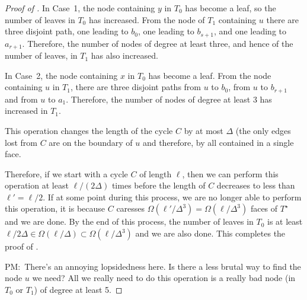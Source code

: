 \documentclass{patmorin}
\newcommand{\dual}[1]{{#1}^\star}
\newcommand{\note}[2]{{\color{red}#1:~#2}}
\begin{document}
\begin{proof}[Proof of ]
In Case~1, the node containing $y$ in $T_0$ has become a leaf, so
the number of leaves in $T_0$ has increased.  From the node of $T_1$
containing $u$ there are three disjoint path, one leading to $b_0$,
one leading to $b_{s+1}$, and one leading to $a_{r+1}$.  Therefore,
the number of nodes of degree at least three, and hence of the number
of leaves, in $T_1$ has also increased.

In Case~2, the node containing $x$ in $T_0$ has become a leaf.  From the
node containing $u$ in $T_1$, there are three disjoint paths from $u$
to $b_0$, from $u$ to $b_{r+1}$ and from $u$ to $a_1$.  Therefore,
the number of nodes of degree at least 3 has increased in $T_1$.

This operation changes the length of the cycle $C$ by at most $\Delta$
(the only edges lost from $C$ are on the boundary of $u$ and therefore,
by  all contained in a single face.

Therefore, if we start with a cycle $C$ of length $\ell$, then we can
perform this operation at least $\ell/(2\Delta)$ times before the length
of $C$ decreases to less than $\ell'=\ell/2$. If at some point during
this process, we are no longer able to perform this operation, it is because $C$ caresses $\Omega(\ell'/\Delta^3)=\Omega(\ell/\Delta^3)$ faces of $\dual{T}$ and we are done.  By the end of this process, the number of leaves in $T_0$ is at least $\ell/2\Delta\in\Omega(\ell/\Delta)\subset\Omega(\ell/\Delta^3)$ and we are also done.  This completes the proof of .

\note{PM}{There's an annoying lopsidedness here. Is there a less brutal way to find the node $u$ we need? All we really need to do this operation is a really bad node (in $T_0$ or $T_1$) of degree at least 5.}
\end{proof}




\end{document}
